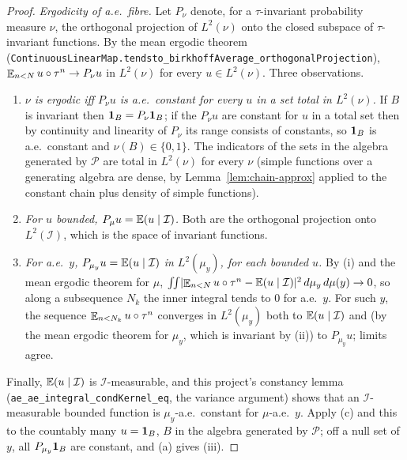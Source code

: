 \begin{proof}
  \emph{Ergodicity of a.e.\ fibre.}  Let $P_\nu$ denote, for a $\tau$-invariant probability
  measure $\nu$, the orthogonal projection of $L^2(\nu)$ onto the closed subspace of
  $\tau$-invariant functions.  By the mean ergodic theorem
  (\texttt{ContinuousLinearMap.tendsto\_birkhoffAverage\_orthogonalProjection}),
  $\mathop{\mathbb{E}}_{n<N} u\circ\tau^n \to P_\nu u$ in $L^2(\nu)$ for every $u \in L^2(\nu)$.
  Three observations.
  \begin{enumerate}
    \item[(a)] \emph{$\nu$ is ergodic iff $P_\nu u$ is a.e.\ constant for every $u$ in a set
      total in $L^2(\nu)$.}  If $B$ is invariant then $\mathbf{1}_B = P_\nu\mathbf{1}_B$; if the $P_\nu u$ are
      constant for $u$ in a total set then by continuity and linearity of $P_\nu$ its range
      consists of constants, so $\mathbf{1}_B$ is a.e.\ constant and $\nu(B) \in \{0,1\}$.  The
      indicators of the sets in the algebra generated by $\mathcal P$ are total in $L^2(\nu)$
      for every $\nu$ (simple functions over a generating algebra are dense, by
      Lemma~\ref{lem:chain-approx} applied to the constant chain plus density of simple
      functions).
    \item[(b)] \emph{For $u$ bounded, $P_\mu u = \mathbb{E}(u\mid\mathcal I)$.}  Both are the
      orthogonal projection onto $L^2(\mathcal I)$, which is the space of invariant functions.
    \item[(c)] \emph{For a.e.\ $y$, $P_{\mu_y}u = \mathbb{E}(u\mid\mathcal I)$ in $L^2(\mu_y)$, for each
      bounded $u$.}  By (i) and the mean ergodic theorem for $\mu$,
      $\int\!\!\int \lvert \mathop{\mathbb{E}}_{n<N}u\circ\tau^n - \mathbb{E}(u\mid\mathcal I) \rvert^2\,d\mu_y\,d\mu(y) \to 0$,
      so along a subsequence $N_k$ the inner integral tends to $0$ for a.e.\ $y$.  For such $y$,
      the sequence $\mathop{\mathbb{E}}_{n<N_k}u\circ\tau^n$ converges in $L^2(\mu_y)$ both to
      $\mathbb{E}(u\mid\mathcal I)$ and (by the mean ergodic theorem for $\mu_y$, which is invariant by
      (ii)) to $P_{\mu_y}u$; limits agree.
  \end{enumerate}
  Finally, $\mathbb{E}(u\mid\mathcal I)$ is $\mathcal I$-measurable, and this project's constancy
  lemma (\texttt{ae\_ae\_integral\_condKernel\_eq}, the variance argument) shows that an
  $\mathcal I$-measurable bounded function is $\mu_y$-a.e.\ constant for $\mu$-a.e.\ $y$.
  Apply (c) and this to the countably many $u = \mathbf{1}_B$, $B$ in the algebra generated by
  $\mathcal P$; off a null set of $y$, all $P_{\mu_y}\mathbf{1}_B$ are constant, and (a) gives (iii).
\end{proof}

